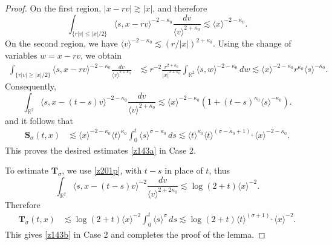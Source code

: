 \documentclass[reqno,11pt]{amsart}
\numberwithin{equation}{section}
\begin{document}
\begin{proof}
On the first region, $|x-rv|\gtrsim |x|$, and therefore
\[
	\int_{\{r|v|\leq |x|/2\}}
	\langle s,x-rv\rangle^{-2-\kappa_0}
	\frac{dv}{\langle v\rangle^{2+\kappa_0}}
	\lesssim \langle x\rangle^{-2-\kappa_0}.
\]
On the second region, we have
$\langle v\rangle^{-2-\kappa_0}\lesssim (r/|x|)^{2+\kappa_0}$. Using the change of
variables $w=x-rv$, we obtain
\begin{align*}
	\int_{\{r|v|\geq |x|/2\}}\langle s,x-rv\rangle^{-2-\kappa_0}
	\frac{dv}{\langle v\rangle^{2+\kappa_0}}&\lesssim
	r^{-2}\frac{r^{2+\kappa_0}}{|x|^{2+\kappa_0}}\int_{\mathbb R^2}\langle s,w\rangle^{-2-\kappa_0}\,dw\lesssim
	\langle x\rangle^{-2-\kappa_0}
	r^{\kappa_0}\langle s\rangle^{-\kappa_0}.
\end{align*}
Consequently,
\[
	\int_{\mathbb R^2}
	\langle s,x-(t-s)v\rangle^{-2-\kappa_0}
	\frac{dv}{\langle v\rangle^{2+\kappa_0}}
	\lesssim
	\langle x\rangle^{-2-\kappa_0}
	\left(1+(t-s)^{\kappa_0}\langle s\rangle^{-\kappa_0}\right).
\]
and it follows that
\begin{align*}
	\mathbf S_\sigma(t,x)
	&\lesssim
	\langle x\rangle^{-2-\kappa_0}
	\langle t\rangle^{\kappa_0}
	\int_0^t\langle s\rangle^{\sigma-\kappa_0}\,ds\lesssim
	\langle t\rangle^{\kappa_0}
	\langle t\rangle^{(\sigma-\kappa_0+1)_+}
	\langle x\rangle^{-2-\kappa_0}.
\end{align*}
This proves the desired estimates \eqref{z143a} in Case 2.

To estimate $\mathbf T_\sigma$, we use \eqref{z201p}, with $t-s$
in place of $t$, thus
\[
	\int_{\mathbb R^2}
	\langle s,x-(t-s)v\rangle^{-2}
	\frac{dv}{\langle v\rangle^{2+2\kappa_0}}
	\lesssim
	\log(2+t)\langle x\rangle^{-2}.
\]
Therefore
\begin{align*}
	\mathbf T_\sigma(t,x)
	&\lesssim\log(2+t)\langle x\rangle^{-2}
	\int_0^t\langle s\rangle^\sigma\,ds\lesssim
	\log(2+t)
	\langle t\rangle^{(\sigma+1)_+}
	\langle x\rangle^{-2}.
\end{align*}
This gives \eqref{z143b} in Case 2 and completes the proof of the lemma.
	\end{proof}
	
	
	
\end{document}
